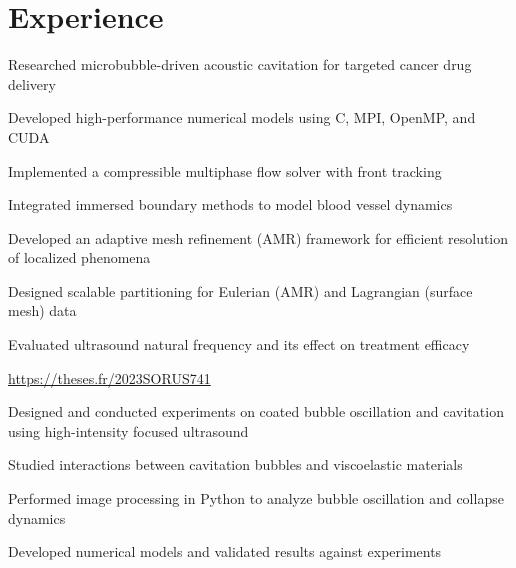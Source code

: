 \documentclass[]{deedy-resume-openfont}
\begin{document}
\begin{minipage}[t]{0.48\textwidth} 


\section{Experience}

\vspace{\topsep} %
\begin{tightemize}
  \item Researched microbubble-driven acoustic cavitation for targeted cancer drug delivery
  \item Developed high-performance numerical models using C, MPI, OpenMP, and CUDA
  \item Implemented a compressible multiphase flow solver with front tracking
  \item Integrated immersed boundary methods to model blood vessel dynamics
  \item Developed an adaptive mesh refinement (AMR) framework for efficient resolution of localized phenomena
  \item Designed scalable partitioning for Eulerian (AMR) and Lagrangian (surface mesh) data
  \item Evaluated ultrasound natural frequency and its effect on treatment efficacy
  \item \href{https://theses.fr/2023SORUS741}{https://theses.fr/2023SORUS741}
\end{tightemize}
\sectionsep

\vspace{\topsep} %
\begin{tightemize}
  \item Designed and conducted experiments on coated bubble oscillation and cavitation using high-intensity focused ultrasound
  \item Studied interactions between cavitation bubbles and viscoelastic materials
  \item Performed image processing in Python to analyze bubble oscillation and collapse dynamics
  \item Developed numerical models and validated results against experiments
\end{tightemize}
\sectionsep



\end{minipage}
\end{document}
